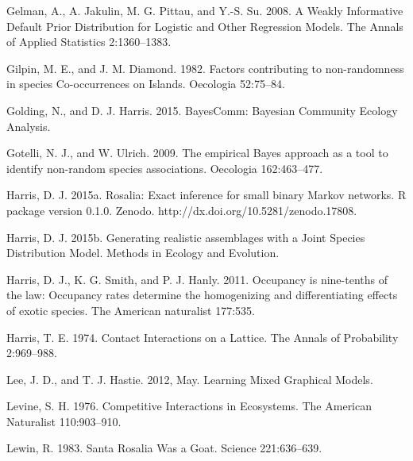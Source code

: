 \documentclass[12pt,]{article}
\begin{document}
\begin{spacing}{1.9}
\begin{flushleft}
Gelman, A., A. Jakulin, M. G. Pittau, and Y.-S. Su. 2008. A Weakly
Informative Default Prior Distribution for Logistic and Other Regression
Models. The Annals of Applied Statistics 2:1360--1383.

Gilpin, M. E., and J. M. Diamond. 1982. Factors contributing to
non-randomness in species Co-occurrences on Islands. Oecologia
52:75--84.

Golding, N., and D. J. Harris. 2015. BayesComm: Bayesian Community
Ecology Analysis.

Gotelli, N. J., and W. Ulrich. 2009. The empirical Bayes approach as a
tool to identify non-random species associations. Oecologia
162:463--477.

Harris, D. J. 2015a. Rosalia: Exact inference for small binary Markov
networks. R package version 0.1.0. Zenodo.
http://dx.doi.org/10.5281/zenodo.17808.

Harris, D. J. 2015b. Generating realistic assemblages with a Joint
Species Distribution Model. Methods in Ecology and Evolution.

Harris, D. J., K. G. Smith, and P. J. Hanly. 2011. Occupancy is
nine-tenths of the law: Occupancy rates determine the homogenizing and
differentiating effects of exotic species. The American naturalist
177:535.

Harris, T. E. 1974. Contact Interactions on a Lattice. The Annals of
Probability 2:969--988.

Lee, J. D., and T. J. Hastie. 2012, May. Learning Mixed Graphical
Models.

Levine, S. H. 1976. Competitive Interactions in Ecosystems. The American
Naturalist 110:903--910.

Lewin, R. 1983. Santa Rosalia Was a Goat. Science 221:636--639.


\end{flushleft}
\end{spacing}
\end{document}
